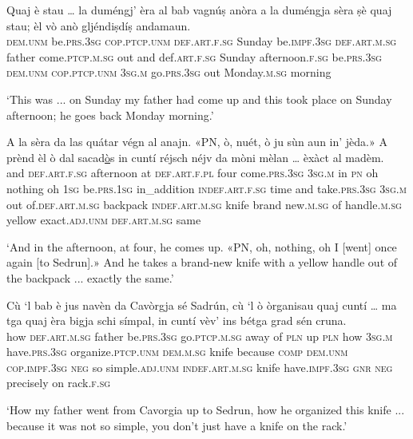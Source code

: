 \begin{linenumbers}
	\gll Quaj è stau … la duméngj’ èra al bab vagnúṣ anòra\footnotemark{} a la duméngja sèra ṣè quaj stau; èl vò anò gljéndiṣdíṣ andamaun.\\
	\textsc{dem.unm} be.\textsc{prs.3sg} \textsc{cop.ptcp.unm} {} \textsc{def.art.f.sg} Sunday be.\textsc{impf.3sg} \textsc{def.art.m.sg} father come.\textsc{ptcp.m.sg} out and def.\textsc{art.f.sg} Sunday afternoon.\textsc{f.sg} be.\textsc{prs.3sg} \textsc{dem.unm} \textsc{cop.ptcp.unm} \textsc{3sg.m} go.\textsc{prs.3sg} out Monday.\textsc{m.sg} morning\\
\end{linenumbers}
\medskip
\glt `This was ... on Sunday my father had come up and this took place on Sunday afternoon; he goes back Monday morning.'
\medskip

\begin{linenumbers}
	\gll A la sèra da las quátar végn al anajn. «PN, ò, nuét, ò ju sùn aun\footnotemark{} in' jèda.» A prènd èl ò dal sacad\underline{ò}s in cuntí réjsch néjv da mòni mèlan … èxàct al madèm.\\
	and \textsc{def.art.f.sg} afternoon at \textsc{def.art.f.pl} four come.\textsc{prs.3sg} \textsc{3sg.m} in \textsc{pn} oh nothing oh \textsc{1sg} be.\textsc{prs.1sg} in\_addition \textsc{indef.art.f.sg} time and take.\textsc{prs.3sg} \textsc{3sg.m} out of.\textsc{def.art.m.sg} backpack \textsc{indef.art.m.sg} knife brand new.\textsc{m.sg} of handle.\textsc{m.sg} yellow {} exact.\textsc{adj.unm} \textsc{def.art.m.sg} same\\
\end{linenumbers}
\medskip
\glt `And in the afternoon, at four, he comes up. «PN, oh, nothing, oh I [went] once again [to Sedrun].» And he takes a brand-new knife with a yellow handle out of the backpack ... exactly the same.'
\medskip

\begin{linenumbers}
	\gll Cù `l bab è jus navèn da Cavòrgja sé Sadrún, cù `l ò òrganisau quaj cuntí … ma tga quaj èra bigja schi símpal, in cuntí vèv’ ins bétga grad sén cruna.\\
	how \textsc{def.art.m.sg} father be.\textsc{prs.3sg} go.\textsc{ptcp.m.sg} away of \textsc{pln} up \textsc{pln} how \textsc{3sg.m} have.\textsc{prs.3sg} organize.\textsc{ptcp.unm} \textsc{dem.m.sg} knife {} because \textsc{comp} \textsc{dem.unm} \textsc{cop.impf.3sg} \textsc{neg} so simple.\textsc{adj.unm} \textsc{indef.art.m.sg} knife have.\textsc{impf.3sg} \textsc{gnr} \textsc{neg} precisely on rack.\textsc{f.sg}\\
\end{linenumbers}
\medskip
\glt `How my father went from Cavorgia up to Sedrun, how he organized this knife ... because it was not so simple, you don't just have a knife on the rack.'
\medskip

